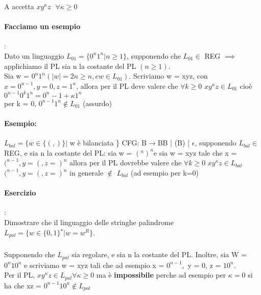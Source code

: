 \documentclass[12pt, a4paper, openany, oneside]{book}
\begin{document}
\begin{center}
\end{center}
A accetta $xy^{\kappa} z ~~~ \forall \kappa \geq 0$
\paragraph{Facciamo un esempio}:\\
Dato un linguaggio $L_{01} = \{0^n 1^n | n\geq 1\}$, supponendo che $L_{01} \in$ REG
$\implies$ applichiamo il PL sia n la costante del PL $(n\geq 1)$. \\
Sia w = $0^{n}1^{n} (|w| = 2n \geq n, e w \in L_{01})$. Scriviamo w = xyz, con 
$x = 0^{n-1}, y=0, z=1^{n}$, allora per il PL deve valere che $\forall k \geq 0$
$xy^{\kappa}z \in L_{01}$ cioè $0^{n-1}0^{k}1^{n} = 0^{n}
-1+\kappa 1^{n}$\\
per k = 0, $0^{n-1}1^{n}\notin L_{01}$ (assurdo)
\paragraph{Esempio: }
$L_{bal} = \{w \in \{(,)\} |$ w è bilanciata \}
CFG: B$\to$BB | (B) | $\epsilon$, supponendo $L_{bal} \in$ REG, e sia n la costante
del PL: sia w = $(^{n})^{n} $e sia w = xyz tale che x = $(^{n-1} , y= (, z = )^{n}$
allora per il PL dovrebbe valere che $\forall k \geq 0$ $xy^{\kappa}z \in L_{bal}$
$(^{n-1} , y= (, z = )^{n}$ in generale $\notin$ $L_{bal}$ (ad esempio per k=0)
\paragraph{Esercizio}:\\
Dimostrare che il linguaggio delle stringhe palindrome 
$L_{pal} = \{w \in \{0,1\}^{\star} | w = w^{R}\}$.
\subparagraph{}Supponendo che $L_{pal}$ sia regolare, e sia n la costante del PL.
Inoltre, sia W = $0^{n}10^{n}$ e scriviamo w = xyz tali che ad esempio x = $0^{n-1},$
y = 0, z = $10^{n}$. \\
Per il PL, $xy^{\kappa}z \in L_{pal} \forall \kappa \geq 0$ ma è \textbf{impossibile}
perche ad esempio per $\kappa = 0$ si ha che xz = $0^{n-1}10^{n} \notin L_{pal}$
\end{document}
